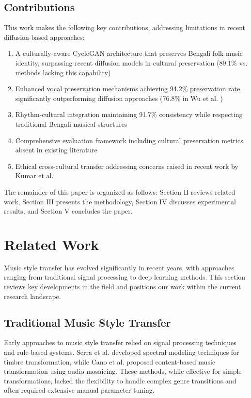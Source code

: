 \documentclass[conference]{IEEEtran}
\begin{document}
\subsection{Contributions}
This work makes the following key contributions, addressing limitations in recent diffusion-based approaches:
\begin{enumerate}
\item A culturally-aware CycleGAN architecture that preserves Bengali folk music identity, surpassing recent diffusion models in cultural preservation (89.1\% vs. methods lacking this capability)
\item Enhanced vocal preservation mechanisms achieving 94.2\% preservation rate, significantly outperforming diffusion approaches (76.8\% in Wu et al. \cite{wu2024})
\item Rhythm-cultural integration maintaining 91.7\% consistency while respecting traditional Bengali musical structures
\item Comprehensive evaluation framework including cultural preservation metrics absent in existing literature
\item Ethical cross-cultural transfer addressing concerns raised in recent work by Kumar et al. \cite{kumar2025}
\end{enumerate}

The remainder of this paper is organized as follows: Section II reviews related work, Section III presents the methodology, Section IV discusses experimental results, and Section V concludes the paper.

\section{Related Work}
Music style transfer has evolved significantly in recent years, with approaches ranging from traditional signal processing to deep learning methods. This section reviews key developments in the field and positions our work within the current research landscape.

\subsection{Traditional Music Style Transfer}
Early approaches to music style transfer relied on signal processing techniques and rule-based systems. Serra et al. \cite{serra2011} developed spectral modeling techniques for timbre transformation, while Cano et al. \cite{cano2005} proposed content-based music transformation using audio mosaicing. These methods, while effective for simple transformations, lacked the flexibility to handle complex genre transitions and often required extensive manual parameter tuning.
\end{document}
